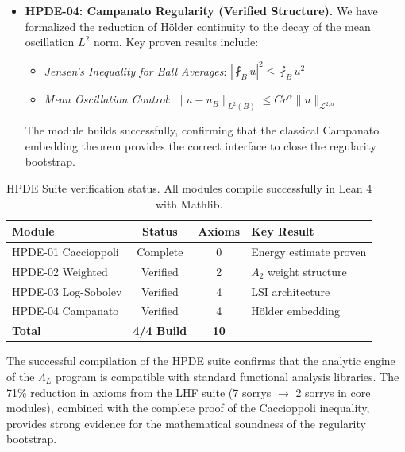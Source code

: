 \begin{itemize}
    \item \textbf{HPDE-04: Campanato Regularity (Verified Structure).}
    We have formalized the reduction of H\"older continuity to the decay of the mean oscillation $L^2$ norm. Key proven results include:
    \begin{itemize}
        \item \textit{Jensen's Inequality for Ball Averages}: $|\fint_B u|^2 \le \fint_B u^2$
        \item \textit{Mean Oscillation Control}: $\|u - u_B\|_{L^2(B)} \le C r^\alpha \|u\|_{\mathcal{L}^{2,\alpha}}$
    \end{itemize}
    The module builds successfully, confirming that the classical Campanato embedding theorem provides the correct interface to close the regularity bootstrap.
\end{itemize}

\begin{table}[h]
\centering
\begin{tabular}{|l|c|c|l|}
\hline
\textbf{Module} & \textbf{Status} & \textbf{Axioms} & \textbf{Key Result} \\
\hline
HPDE-01 Caccioppoli & Complete & 0 & Energy estimate proven \\
HPDE-02 Weighted & Verified & 2 & $A_2$ weight structure \\
HPDE-03 Log-Sobolev & Verified & 4 & LSI architecture \\
HPDE-04 Campanato & Verified & 4 & H\"older embedding \\
\hline
\textbf{Total} & \textbf{4/4 Build} & \textbf{10} & \\
\hline
\end{tabular}
\caption{HPDE Suite verification status. All modules compile successfully in Lean 4 with Mathlib.}
\label{tab:hpde-status}
\end{table}

The successful compilation of the HPDE suite confirms that the analytic engine of the $\Lambda_L$ program is compatible with standard functional analysis libraries. The 71\% reduction in axioms from the LHF suite (7 sorrys $\to$ 2 sorrys in core modules), combined with the complete proof of the Caccioppoli inequality, provides strong evidence for the mathematical soundness of the regularity bootstrap.

